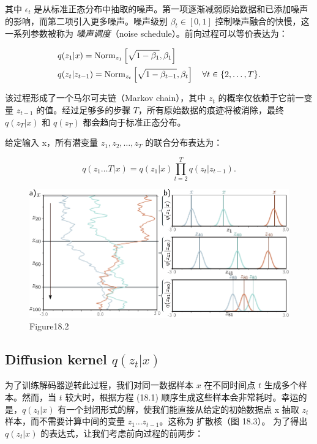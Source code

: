 \documentclass[lang=cn,newtx,10pt,scheme=chinese]{elegantbook}
\begin{document}
其中 \( \epsilon_t \) 是从标准正态分布中抽取的噪声。第一项逐渐减弱原始数据和已添加噪声的影响，而第二项引入更多噪声。噪声级别 \( \beta_t \in [0, 1] \) 控制噪声融合的快慢，这一系列参数被称为 \textit{噪声调度}（noise schedule）。前向过程可以等价表达为：



\begin{align}
&q(z_1|x) = \text{Norm}_{z_1} \left[ \sqrt{1 - \beta_1}, \beta_1 \right] \notag \\
&q(z_t|z_{t-1}) = \text{Norm}_{z_t} \left[ \sqrt{1 - \beta_{t-1}}, \beta_t \right] \quad \forall t \in \{2, \ldots, T\}. 
\end{align} 


该过程形成了一个马尔可夫链（Markov chain），其中 \(z_t\) 的概率仅依赖于它前一变量 \(z_{t-1}\) 的值。经过足够多的步骤 \(T\)，所有原始数据的痕迹将被消除，最终 \(q(z_T|x)\) 和 \(q(z_T)\) 都会趋向于标准正态分布。

给定输入 x，所有潜变量 \(z_1, z_2, \ldots, z_T\) 的联合分布表达为：

\begin{equation}
q(z_1\ldots T|x) = q(z_1|x) \prod_{t=2}^{T} q(z_t|z_{t-1}). 
\end{equation}


\begin{figure}[ht!]
\centering
\includegraphics[width=0.7\linewidth]{PDFFigures/UDLChap18PDF/DiffusionForward2.pdf}
\caption{Figure18.2}
\end{figure}

\subsection{Diffusion kernel \texorpdfstring{\(q(z_t|x)\)}{} }
为了训练解码器逆转此过程，我们对同一数据样本 \(x\) 在不同时间点 \(t\) 生成多个样本。然而，当 \(t\) 较大时，根据方程 (18.1) 顺序生成这些样本会非常耗时。幸运的是，\(q(z_t|x)\) 有一个封闭形式的解，使我们能直接从给定的初始数据点 x 抽取 \(z_t\) 样本，而不需要计算中间的变量 \(z_1 \ldots z_{t-1}\)。这称为 扩散核（图 18.3）。 为了得出 \(q(z_t|x)\) 的表达式，让我们考虑前向过程的前两步：
\end{document}
